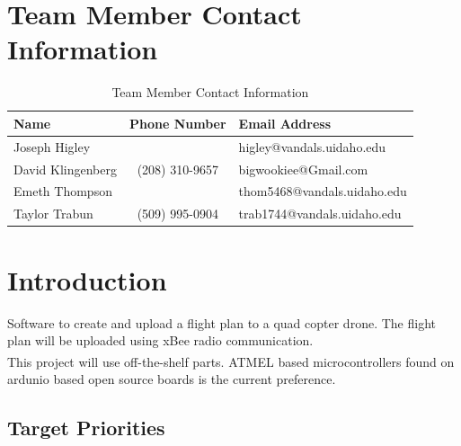 \documentclass[pdftex,11pt]{article}
\begin{document}
\begin{titlepage}

\newpage
\thispagestyle{empty}
\mbox{}
\end{titlepage}

\tableofcontents
\listoffigures
\listoftables

\clearpage
{}
\setcounter{page}{1}
\section{Team Member Contact Information}
  	\begin{table}[h]
  	\centering
		\begin{tabular}{| l | c | p{5cm} |}
		\hline
		Name & Phone Number & Email Address\\\hline
		Joseph Higley & & higley@vandals.uidaho.edu\\
		David Klingenberg  &  (208) 310-9657 &  bigwookiee@Gmail.com\\
		Emeth Thompson & & thom5468@vandals.uidaho.edu\\
		Taylor Trabun & (509) 995-0904 & trab1744@vandals.uidaho.edu\\
		\hline
	\end{tabular}
\caption{Team Member Contact Information}
\label{table:1}
\end{table}


\section{Introduction}


Software to create and upload a flight plan to a quad copter drone. The flight plan will be uploaded using xBee radio communication.\\

This project will use off-the-shelf parts.  ATMEL\textsuperscript{\textcopyright} based microcontrollers found on ardunio based open source boards is the current preference.

\subsection{Target Priorities}
\end{document}
